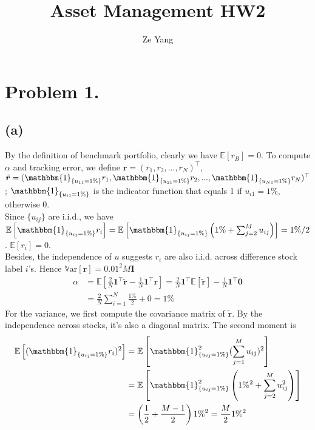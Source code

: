 \documentclass[11pt]{article}
\title{Asset Management HW2}
\author{Ze Yang}
\begin{document}
    
    
    \maketitle
    
   \section{Problem 1.} 
    \subsection{(a)} 
    By the definition of benchmark portfolio, clearly we have $\mathbb{E}\left[r_B\right] = 0$. To compute $\alpha$ and tracking error, we define $\bm{r} = (r_1, r_2, ..., r_N)^{\top}$, $\tilde{\bm{r}} = (\mathbbm{1}_{\{u_{11}=1\%\}}r_1, \mathbbm{1}_{\{u_{21}=1\%\}}r_2, ..., \mathbbm{1}_{\{u_{N1}=1\%\}}r_N)^{\top}$; $\mathbbm{1}_{\{u_{i1}=1\%\}}$ is the indicator function that equals 1 if $u_{i1} = 1\%$, otherwise 0.\\
Since $\{u_{ij}\}$ are i.i.d., we have $\mathbb{E}\left[\mathbbm{1}_{\{u_{ij}=1\%\}}r_i\right] = \mathbb{E}\left[\mathbbm{1}_{\{u_{ij}=1\%\}}\left(1\%+\sum_{j=2}^M u_{ij}\right)\right] = 1\%/2$. $\mathbb{E}\left[r_i\right] = 0$.\\
Besides, the independence of $u$ suggests $r_i$ are also i.i.d. across difference stock label $i$'s. Hence $\mathrm{\mathbb{V}ar}\left[\bm{r}\right] = 0.01^2 M \bm{I}$
\begin{equation}
  \begin{split}
    \alpha &= \mathbb{E}\left[\frac{2}{N}\bm{1}^{\top}\tilde{\bm{r}} - \frac{1}{N} \bm{1}^{\top} \bm{r}\right] = \frac{2}{N} \bm{1}^{\top} \mathbb{E}\left[\tilde{\bm{r}}\right] - \frac{1}{N}\bm{1}^{\top} \bm{0} \\
    &= \frac{2}{N}\sum_{i=1}^N \frac{1\%}{2} + 0 = 1\%
  \end{split}
 \end{equation} 
For the variance, we first compute the covariance matrix of $\bm{\tilde{\bm{r}}}$. By the independence across stocks, it's also a diagonal matrix. The second moment is
\begin{equation}
  \begin{split}
    \mathbb{E}\left[(\mathbbm{1}_{\{u_{ij}=1\%\}}r_i)^2\right] &= \mathbb{E}\left[\mathbbm{1}^2_{\{u_{ij}=1\%\}}(\sum_{j=1}^M u_{ij})^2\right] \\
  &=\mathbb{E}\left[\mathbbm{1}^2_{\{u_{ij}=1\%\}}\left(1\%^2 + \sum_{j=2}^M u_{ij}^2\right)\right]\\
  &=\left(\frac{1}{2} + \frac{M-1}{2}\right) 1\%^2 = \frac{M}{2}1\%^2
  \end{split}
\end{equation}
\end{document}

